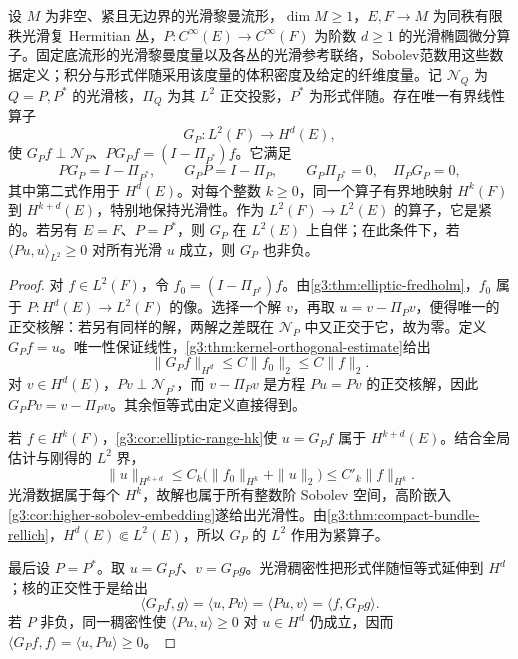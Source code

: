 \begin{theorem}\label{g3:thm:elliptic-green-general}
	设 \(M\) 为非空、紧且无边界的光滑黎曼流形，\(\dim M\ge1\)，\(E,F\to M\) 为同秩有限秩光滑复 Hermitian 丛，\(P:C^\infty(E)\to C^\infty(F)\) 为阶数 \(d\ge1\) 的光滑椭圆微分算子。固定底流形的光滑黎曼度量以及各丛的光滑参考联络，Sobolev范数用这些数据定义；积分与形式伴随采用该度量的体积密度及给定的纤维度量。记 \(\mathcal N_Q\) 为 \(Q=P,P^*\) 的光滑核，\(\Pi_Q\) 为其 \(L^2\) 正交投影，\(P^*\) 为形式伴随。存在唯一有界线性算子
	\[
		G_P:L^2(F)\longrightarrow H^d(E),
	\]
	使 \(G_Pf\perp \mathcal N_P\)、\(PG_Pf=(I-\Pi_{P^*})f\)。它满足
	\begin{equation}\label{g3:eq:green-identities}
		PG_P=I-\Pi_{P^*},\qquad
		G_PP=I-\Pi_P,\qquad
		G_P\Pi_{P^*}=0,\quad \Pi_PG_P=0,
	\end{equation}
	其中第二式作用于 \(H^d(E)\)。对每个整数 \(k\ge0\)，同一个算子有界地映射 \(H^k(F)\) 到 \(H^{k+d}(E)\)，特别地保持光滑性。作为 \(L^2(F)\to L^2(E)\) 的算子，它是紧的。若另有 \(E=F\)、\(P=P^*\)，则 \(G_P\) 在 \(L^2(E)\) 上自伴；在此条件下，若 \(\langle Pu,u\rangle_{L^2}\ge0\) 对所有光滑 \(u\) 成立，则 \(G_P\) 也非负。
\end{theorem}
\begin{proof}
	对 \(f\in L^2(F)\)，令 \(f_0=(I-\Pi_{P^*})f\)。由\cref{g3:thm:elliptic-fredholm}，\(f_0\) 属于 \(P:H^d(E)\to L^2(F)\) 的像。选择一个解 \(v\)，再取 \(u=v-\Pi_Pv\)，便得唯一的正交核解：若另有同样的解，两解之差既在 \(\mathcal N_P\) 中又正交于它，故为零。定义 \(G_Pf=u\)。唯一性保证线性，\cref{g3:thm:kernel-orthogonal-estimate}给出
	\[
		\|G_Pf\|_{H^d}\le C\|f_0\|_2\le C\|f\|_2.
	\]
	对 \(v\in H^d(E)\)，\(Pv\perp \mathcal N_{P^*}\)，而 \(v-\Pi_Pv\) 是方程 \(Pu=Pv\) 的正交核解，因此 \(G_PPv=v-\Pi_Pv\)。其余恒等式由定义直接得到。

	若 \(f\in H^k(F)\)，\cref{g3:cor:elliptic-range-hk}使 \(u=G_Pf\) 属于 \(H^{k+d}(E)\)。结合全局估计与刚得的 \(L^2\) 界，
	\[
		\|u\|_{H^{k+d}}
		\le C_k\bigl(\|f_0\|_{H^k}+\|u\|_2\bigr)
		\le C'_k\|f\|_{H^k}.
	\]
	光滑数据属于每个 \(H^k\)，故解也属于所有整数阶 Sobolev 空间，高阶嵌入\cref{g3:cor:higher-sobolev-embedding}遂给出光滑性。由\cref{g3:thm:compact-bundle-rellich}，\(H^d(E)\Subset L^2(E)\)，所以 \(G_P\) 的 \(L^2\) 作用为紧算子。

	最后设 \(P=P^*\)。取 \(u=G_Pf\)、\(v=G_Pg\)。光滑稠密性把形式伴随恒等式延伸到 \(H^d\)；核的正交性于是给出
	\[
		\langle G_Pf,g\rangle
		=\langle u,Pv\rangle
		=\langle Pu,v\rangle
		=\langle f,G_Pg\rangle.
	\]
	若 \(P\) 非负，同一稠密性使 \(\langle Pu,u\rangle\ge0\) 对 \(u\in H^d\) 仍成立，因而
	\(\langle G_Pf,f\rangle=\langle u,Pu\rangle\ge0\)。
\end{proof}

